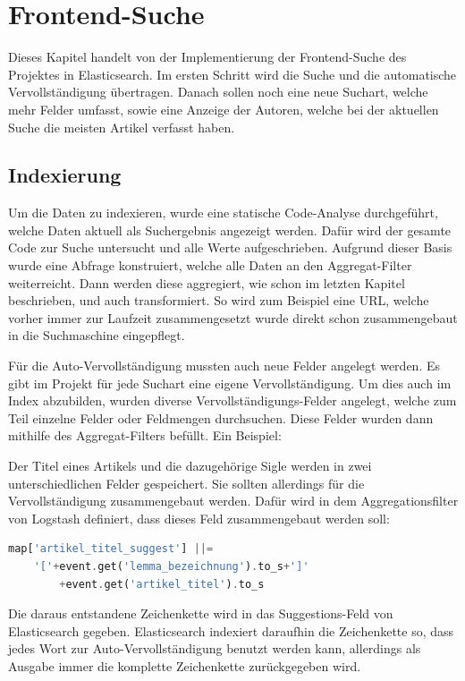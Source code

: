 \chapter{Frontend-Suche}

Dieses Kapitel handelt von der Implementierung der Frontend-Suche des Projektes in Elasticsearch. Im ersten Schritt wird die Suche und die automatische Vervollständigung übertragen. Danach sollen noch eine neue Suchart, welche mehr Felder umfasst, sowie eine Anzeige der Autoren, welche bei der aktuellen Suche die meisten Artikel verfasst haben.

\section{Indexierung}

Um die Daten zu indexieren, wurde eine statische Code-Analyse durchgeführt, welche Daten aktuell als Suchergebnis angezeigt werden. Dafür wird der gesamte Code zur Suche untersucht und alle Werte aufgeschrieben. Aufgrund dieser Basis wurde eine Abfrage konstruiert, welche alle Daten an den Aggregat-Filter weiterreicht. Dann werden diese aggregiert, wie schon im letzten Kapitel beschrieben, und auch transformiert. So wird zum Beispiel eine URL, welche vorher immer zur Laufzeit zusammengesetzt wurde direkt schon zusammengebaut in die Suchmaschine eingepflegt. 

Für die Auto-Vervollständigung mussten auch neue Felder angelegt werden. Es gibt im Projekt für jede Suchart eine eigene Vervollständigung. Um dies auch im Index abzubilden, wurden diverse Vervollständigungs-Felder angelegt, welche zum Teil einzelne Felder oder Feldmengen durchsuchen. Diese Felder wurden dann mithilfe des Aggregat-Filters befüllt. Ein Beispiel:

Der Titel eines Artikels und die dazugehörige Sigle werden in zwei unterschiedlichen Felder gespeichert. Sie sollten allerdings für die Vervollständigung zusammengebaut werden. Dafür wird in dem Aggregationsfilter von Logstash definiert, dass dieses Feld zusammengebaut werden soll:

\begin{lstlisting}[language=PHP, frame=single, label={lst:stringConcat}, caption=Zeichenketten-Konkatination im Aggregat Filter von Logstash ,captionpos=b] 
map['artikel_titel_suggest'] ||= 
    '['+event.get('lemma_bezeichnung').to_s+']'
        +event.get('artikel_titel').to_s
\end{lstlisting}
    
Die daraus entstandene Zeichenkette wird in das Suggestions-Feld von Elasticsearch gegeben. Elasticsearch indexiert daraufhin die Zeichenkette so, dass jedes Wort zur Auto-Vervollständigung benutzt werden kann, allerdings als Ausgabe immer die komplette Zeichenkette zurückgegeben wird.

